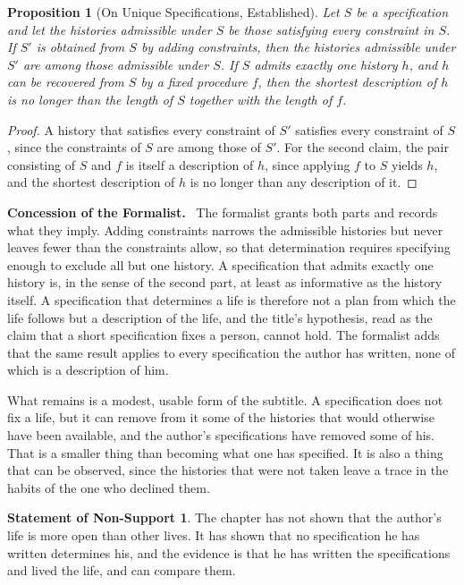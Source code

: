 \documentclass[11pt,openany,twoside]{book}
\theoremstyle{plain}
\newtheorem{proposition}{Proposition}[chapter]
\theoremstyle{definition}
\newtheorem{nonsupport}{Statement of Non-Support}
\theoremstyle{remark}
\newenvironment{concession}{\par\medskip\noindent\textbf{Concession of the Formalist.}\ }{\par\medskip}
\begin{document}
\begin{proposition}[On Unique Specifications, Established]\label{prop:unique}
Let $S$ be a specification and let the histories admissible under $S$ be those satisfying every constraint in $S$. If $S'$ is obtained from $S$ by adding constraints, then the histories admissible under $S'$ are among those admissible under $S$. If $S$ admits exactly one history $h$, and $h$ can be recovered from $S$ by a fixed procedure $f$, then the shortest description of $h$ is no longer than the length of $S$ together with the length of $f$.
\end{proposition}

\begin{proof}
A history that satisfies every constraint of $S'$ satisfies every constraint of $S$, since the constraints of $S$ are among those of $S'$. For the second claim, the pair consisting of $S$ and $f$ is itself a description of $h$, since applying $f$ to $S$ yields $h$, and the shortest description of $h$ is no longer than any description of it.
\end{proof}

\begin{concession}
The formalist grants both parts and records what they imply. Adding constraints narrows the admissible histories but never leaves fewer than the constraints allow, so that determination requires specifying enough to exclude all but one history. A specification that admits exactly one history is, in the sense of the second part, at least as informative as the history itself. A specification that determines a life is therefore not a plan from which the life follows but a description of the life, and the title's hypothesis, read as the claim that a short specification fixes a person, cannot hold. The formalist adds that the same result applies to every specification the author has written, none of which is a description of him.
\end{concession}

What remains is a modest, usable form of the subtitle. A specification does not fix a life, but it can remove from it some of the histories that would otherwise have been available, and the author's specifications have removed some of his. That is a smaller thing than becoming what one has specified. It is also a thing that can be observed, since the histories that were not taken leave a trace in the habits of the one who declined them.

\begin{nonsupport}
The chapter has not shown that the author's life is more open than other lives. It has shown that no specification he has written determines his, and the evidence is that he has written the specifications and lived the life, and can compare them.
\end{nonsupport}
\end{document}
